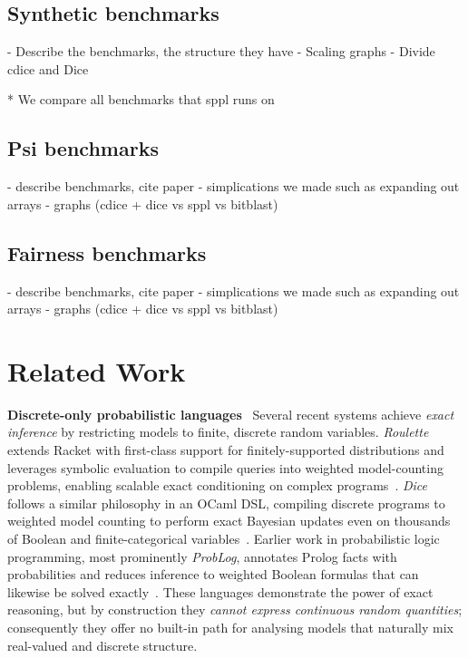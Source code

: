 \documentclass[acmsmall,screen,dvipsnames,x11names,nonacm,anonymous,review]{acmart}
\renewcommand{\paragraph}[1]{\vspace{1em}\noindent\textbf{#1}\ }
\begin{document}
\subsection{Synthetic benchmarks}\label{sec:synthetic-benchmarks}
- Describe the benchmarks, the structure they have
- Scaling graphs
- Divide cdice and Dice

* We compare all benchmarks that sppl runs on
\subsection{Psi benchmarks}\label{sec:psi-benchmarks}
- describe benchmarks, cite paper
- simplications we made such as expanding out arrays
- graphs (cdice + dice vs sppl vs bitblast)

\subsection{Fairness benchmarks}\label{sec:fairness-benchmarks}
- describe benchmarks, cite paper
- simplications we made such as expanding out arrays
- graphs (cdice + dice vs sppl vs bitblast)





\section{Related Work}
\label{sec:related}

\paragraph{Discrete-only probabilistic languages}  
Several recent systems achieve \emph{exact inference} by restricting models to finite, discrete random variables. \emph{Roulette} extends Racket with first-class support for finitely-supported distributions and leverages symbolic evaluation to compile queries into weighted model-counting problems, enabling scalable exact conditioning on complex programs~\cite{Moy2025Roulette}. \emph{Dice} follows a similar philosophy in an OCaml DSL, compiling discrete programs to weighted model counting to perform exact Bayesian updates even on thousands of Boolean and finite-categorical variables~\cite{Holtzen2020Dice}. Earlier work in probabilistic logic programming, most prominently \emph{ProbLog}, annotates Prolog facts with probabilities and reduces inference to weighted Boolean formulas that can likewise be solved exactly~\cite{DeRaedt2007ProbLog}. These languages demonstrate the power of exact reasoning, but by construction they \emph{cannot express continuous random quantities}; consequently they offer no built-in path for analysing models that naturally mix real-valued and discrete structure.  
\end{document}
